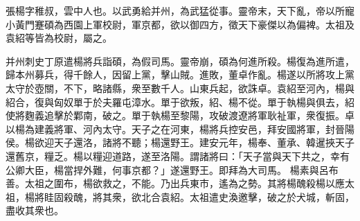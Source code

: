 \begin{pinyinscope}
 
 
 張楊字稚叔，雲中人也。以武勇給并州，為武猛從事。靈帝末，天下亂，帝以所寵小黃門蹇碩為西園上軍校尉，軍京都，欲以御四方，徵天下豪傑以為偏裨。太祖及袁紹等皆為校尉，屬之。
 
 
 并州刺史丁原遣楊將兵詣碩，為假司馬。靈帝崩，碩為何進所殺。楊復為進所遣，歸本州募兵，得千餘人，因留上黨，擊山賊。進敗，董卓作亂。楊遂以所將攻上黨太守於壺關，不下，略諸縣，衆至數千人。山東兵起，欲誅卓。袁紹至河內，楊與紹合，復與匈奴單于於夫羅屯漳水。單于欲叛，紹、楊不從。單于執楊與俱去，紹使將麴義追擊於鄴南，破之。單于執楊至黎陽，攻破渡遼將軍耿祉軍，衆復振。卓以楊為建義將軍、河內太守。天子之在河東，楊將兵控安邑，拜安國將軍，封晉陽侯。楊欲迎天子還洛，諸將不聽；楊還野王。建安元年，楊奉、董承、韓暹挾天子還舊京，糧乏。楊以糧迎道路，遂至洛陽。謂諸將曰：「天子當與天下共之，幸有公卿大臣，楊當捍外難，何事京都？」遂還野王。即拜為大司馬。
 楊素與呂布善。太祖之圍布，楊欲救之，不能。乃出兵東市，遙為之勢。其將楊醜殺楊以應太祖，楊將眭固殺醜，將其衆，欲北合袁紹。太祖遣史渙邀擊，破之於犬城，斬固，盡收其衆也。
 
 
\end{pinyinscope}